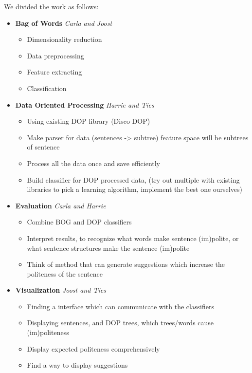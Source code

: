 \documentclass[11pt, english]{article}
\begin{document}
We divided the work as follows:
\begin{itemize}
\item \textbf{Bag of Words} \emph{Carla and Joost}
	\begin{itemize}
		\item Dimensionality reduction
		\item Data preprocessing
		\item Feature extracting
		\item Classification
	\end{itemize}

\item \textbf{Data Oriented Processing} \emph{Harrie and Ties}
	\begin{itemize}
		\item Using existing DOP library (Disco-DOP)
		\item Make parser for data (sentences -> subtree) feature space will be subtrees of sentence
		\item Process all the data once and save efficiently
		\item Build classifier for DOP processed data, (try out multiple with existing libraries to pick a learning algorithm, implement the best one ourselves)
	\end{itemize}

\item \textbf{Evaluation} \emph{Carla and Harrie}
	\begin{itemize}
		\item Combine BOG and DOP classifiers
		\item Interpret results, to recognize what words make sentence (im)polite, or what sentence structures make the sentence (im)polite
		\item Think of method that can generate suggestions which increase the politeness of the sentence
	\end{itemize}

\item \textbf{Visualization} \emph{Joost and Ties}
	\begin{itemize}
		\item Finding a interface which can communicate with the classifiers
		\item Displaying sentences, and DOP trees, which trees/words cause (im)politeness
		\item Display expected politeness comprehensively
		\item Find a way to display suggestions
	\end{itemize}

\end{itemize}
\end{document}
